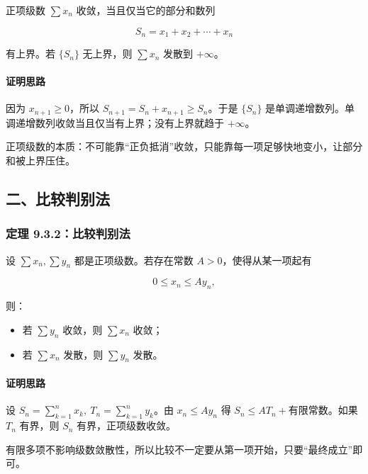 正项级数 \(\sum x_n\) 收敛，当且仅当它的部分和数列

\[
      S_n=x_1+x_2+\cdots+x_n
    \]

有上界。若 \(\{S_n\}\) 无上界，则 \(\sum x_n\) 发散到 \(+\infty\)。

\paragraph*{证明思路}

因为 \(x_{n+1}\ge 0\)，所以 \(S_{n+1}=S_n+x_{n+1}\ge S_n\)。于是 \(\{S_n\}\) 是单调递增数列。单调递增数列收敛当且仅当有上界；没有上界就趋于 \(+\infty\)。

\begin{notebox}
正项级数的本质：不可能靠“正负抵消”收敛，只能靠每一项足够快地变小，让部分和被上界压住。
\end{notebox}

\subsection*{二、比较判别法}

\subsubsection*{定理 9.3.2：比较判别法}

设 \(\sum x_n,\sum y_n\) 都是正项级数。若存在常数 \(A>0\)，使得从某一项起有

\[
      0\le x_n\le A y_n,
    \]

则：

\begin{itemize}
 \item 若 \(\sum y_n\) 收敛，则 \(\sum x_n\) 收敛；
 \item 若 \(\sum x_n\) 发散，则 \(\sum y_n\) 发散。
 \end{itemize}

\paragraph*{证明思路}

设 \(S_n=\sum_{k=1}^n x_k,\ T_n=\sum_{k=1}^n y_k\)。由 \(x_n\le A y_n\) 得 \(S_n\le A T_n+\text{有限常数}\)。如果 \(T_n\) 有界，则 \(S_n\) 有界，正项级数收敛。

\begin{notebox}
有限多项不影响级数敛散性，所以比较不一定要从第一项开始，只要“最终成立”即可。
\end{notebox}

